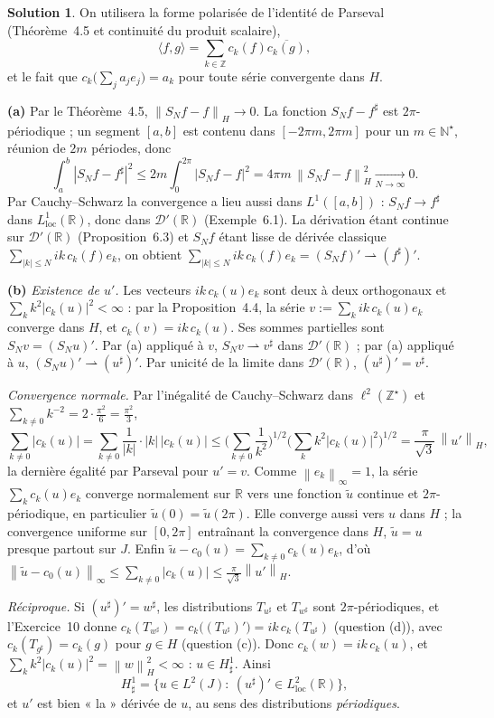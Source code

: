 \documentclass[11pt,a4paper]{article}
\newcommand{\R}{\mathbb{R}}
\newcommand{\N}{\mathbb{N}}
\newcommand{\Z}{\mathbb{Z}}
\newcommand{\norm}[1]{\left\|#1\right\|}
\newcommand{\wk}{\rightharpoonup}
\newcommand{\D}{\mathcal{D}}
\theoremstyle{definition}
\newtheorem*{solution}{Solution}
\begin{document}
\begin{solution}
On utilisera la forme polarisée de l'identité de Parseval (Théorème~4.5 et continuité du produit scalaire),
\[
\langle f,g\rangle=\sum_{k\in\Z}c_k(f)\overline{c_k(g)},
\]
et le fait que $c_k\big(\sum_ja_je_j\big)=a_k$ pour toute série convergente dans $H$.

\medskip
\noindent\textbf{(a)} Par le Théorème~4.5, $\norm{S_Nf-f}_H\to0$. La fonction $S_Nf-f^\sharp$ est $2\pi$-périodique ; un segment $[a,b]$ est contenu dans $[-2\pi m,2\pi m]$ pour un $m\in\N^\star$, réunion de $2m$ périodes, donc
\[
\int_a^b|S_Nf-f^\sharp|^2\le2m\int_0^{2\pi}|S_Nf-f|^2=4\pi m\,\norm{S_Nf-f}_H^2\xrightarrow[N\to\infty]{}0 .
\]
Par Cauchy--Schwarz la convergence a lieu aussi dans $L^1([a,b])$ : $S_Nf\to f^\sharp$ dans $L^1_{\mathrm{loc}}(\R)$, donc dans $\D'(\R)$ (Exemple~6.1). La dérivation étant continue sur $\D'(\R)$ (Proposition~6.3) et $S_Nf$ étant lisse de dérivée classique $\sum_{|k|\le N}ik\,c_k(f)e_k$, on obtient $\sum_{|k|\le N}ik\,c_k(f)e_k=(S_Nf)'\wk(f^\sharp)'$.

\medskip
\noindent\textbf{(b)} \emph{Existence de $u'$.} Les vecteurs $ik\,c_k(u)e_k$ sont deux à deux orthogonaux et $\sum_kk^2|c_k(u)|^2<\infty$ : par la Proposition~4.4, la série $v:=\sum_kik\,c_k(u)e_k$ converge dans $H$, et $c_k(v)=ik\,c_k(u)$. Ses sommes partielles sont $S_Nv=(S_Nu)'$. Par (a) appliqué à $v$, $S_Nv\wk v^\sharp$ dans $\D'(\R)$ ; par (a) appliqué à $u$, $(S_Nu)'\wk(u^\sharp)'$. Par unicité de la limite dans $\D'(\R)$, $(u^\sharp)'=v^\sharp$.

\emph{Convergence normale.} Par l'inégalité de Cauchy--Schwarz dans $\ell^2(\Z^\star)$ et $\sum_{k\ne0}k^{-2}=2\cdot\frac{\pi^2}6=\frac{\pi^2}3$,
\[
\sum_{k\ne0}|c_k(u)|=\sum_{k\ne0}\frac1{|k|}\cdot|k|\,|c_k(u)|\le\Big(\sum_{k\ne0}\frac1{k^2}\Big)^{1/2}\Big(\sum_{k}k^2|c_k(u)|^2\Big)^{1/2}=\frac\pi{\sqrt3}\,\norm{u'}_H ,
\]
la dernière égalité par Parseval pour $u'=v$. Comme $\norm{e_k}_\infty=1$, la série $\sum_kc_k(u)e_k$ converge normalement sur $\R$ vers une fonction $\tilde u$ continue et $2\pi$-périodique, en particulier $\tilde u(0)=\tilde u(2\pi)$. Elle converge aussi vers $u$ dans $H$ ; la convergence uniforme sur $[0,2\pi]$ entraînant la convergence dans $H$, $\tilde u=u$ presque partout sur $J$. Enfin $\tilde u-c_0(u)=\sum_{k\ne0}c_k(u)e_k$, d'où $\norm{\tilde u-c_0(u)}_\infty\le\sum_{k\ne0}|c_k(u)|\le\frac\pi{\sqrt3}\norm{u'}_H$.

\emph{Réciproque.} Si $(u^\sharp)'=w^\sharp$, les distributions $T_{u^\sharp}$ et $T_{w^\sharp}$ sont $2\pi$-périodiques, et l'Exercice~10 donne $c_k(T_{w^\sharp})=c_k\big((T_{u^\sharp})'\big)=ik\,c_k(T_{u^\sharp})$ (question (d)), avec $c_k(T_{g^\sharp})=c_k(g)$ pour $g\in H$ (question (c)). Donc $c_k(w)=ik\,c_k(u)$, et $\sum_kk^2|c_k(u)|^2=\norm w_H^2<\infty$ : $u\in H^1_\sharp$. Ainsi
\[
H^1_\sharp=\{u\in L^2(J):\ (u^\sharp)'\in L^2_{\mathrm{loc}}(\R)\},
\]
et $u'$ est bien « la » dérivée de $u$, au sens des distributions \emph{périodiques}.


\end{solution}
\end{document}
